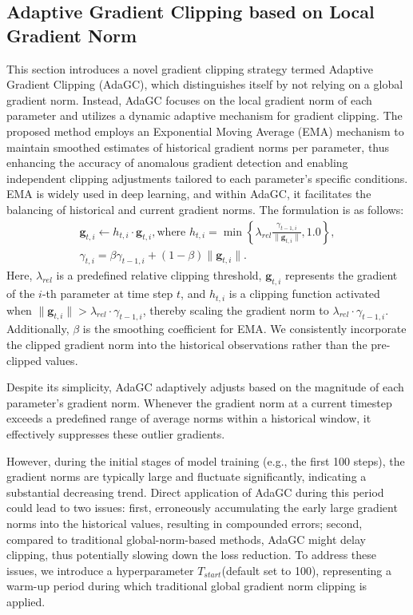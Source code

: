 \subsection{Adaptive Gradient Clipping based on Local Gradient Norm}
This section introduces a novel gradient clipping strategy termed Adaptive Gradient Clipping (AdaGC), which distinguishes itself by not relying on a global gradient norm. Instead, AdaGC focuses on the local gradient norm of each parameter and utilizes a dynamic adaptive mechanism for gradient clipping. The proposed method employs an Exponential Moving Average (EMA) mechanism to maintain smoothed estimates of historical gradient norms per parameter, thus enhancing the accuracy of anomalous gradient detection and enabling independent clipping adjustments tailored to each parameter's specific conditions. EMA is widely used in deep learning, and within AdaGC, it facilitates the balancing of historical and current gradient norms. The formulation is as follows:
\begin{equation}
    \label{eq:AdaptiveNormClip}
    \begin{array}{c}
    \boldsymbol{g}_{t, i} \leftarrow h_{t, i} \cdot \boldsymbol{g}_{t, i} , \text{where } h_{t, i} = \min \left\{\lambda_{rel} \frac{\gamma_{t-1, i}}{\|\boldsymbol{g}_{t, i}\|}, 1.0\right\}, \\[1em]
    \gamma_{t, i} = \beta \gamma_{t-1, i} + (1 - \beta) \|\boldsymbol{g}_{t, i}\|.
    \end{array}
\end{equation}
Here, $\lambda_{rel}$ is a predefined relative clipping threshold, $\boldsymbol{g}_{t,i}$ represents the gradient of the $i$-th parameter at time step $t$, and $h_{t,i}$ is a clipping function activated when $\|\boldsymbol{g}_{t, i}\| > \lambda_{rel} \cdot \gamma_{t-1,i}$, thereby scaling the gradient norm to $\lambda_{rel} \cdot \gamma_{t-1,i}$. Additionally, $\beta$ is the smoothing coefficient for EMA. We consistently incorporate the clipped gradient norm into the historical observations rather than the pre-clipped values.

Despite its simplicity, AdaGC adaptively adjusts based on the magnitude of each parameter's gradient norm. Whenever the gradient norm at a current timestep exceeds a predefined range of average norms within a historical window, it effectively suppresses these outlier gradients. 

However, during the initial stages of model training (e.g., the first 100 steps), the gradient norms are typically large and fluctuate significantly, indicating a substantial decreasing trend. Direct application of AdaGC during this period could lead to two issues: first, erroneously accumulating the early large gradient norms into the historical values, resulting in compounded errors; second, compared to traditional global-norm-based methods, AdaGC might delay clipping, thus potentially slowing down the loss reduction. To address these issues, we introduce a hyperparameter $T_{start}$(default set to 100), representing a warm-up period during which traditional global gradient norm clipping is applied.

